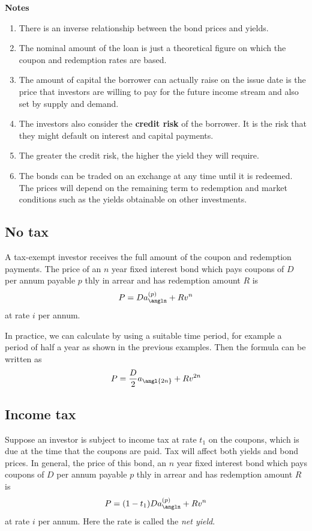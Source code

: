 \documentclass[landscape, 20pt]{extreport}
\theoremstyle{definition}
\theoremstyle{definition}
\theoremstyle{definition}
\theoremstyle{definition}
\theoremstyle{remark}
\begin{document}
\textbf{Notes}

\begin{enumerate}
\def\labelenumi{\arabic{enumi}.}
\item
  There is an inverse relationship between the bond prices and yields.
\item
  The nominal amount of the loan is just a theoretical figure on which
  the coupon and redemption rates are based.
\item
  The amount of capital the borrower can actually raise on the issue
  date is the price that investors are willing to pay for the future
  income stream and also set by supply and demand.
\item
  The investors also consider the \textbf{credit risk} of the borrower. It
  is the risk that they might default on interest and capital
  payments.
\item
  The greater the credit risk, the higher the yield they will require.
\item
  The bonds can be traded on an exchange at any time until it is
  redeemed. The prices will depend on the remaining term to redemption
  and market conditions such as the yields obtainable on other
  investments.
\end{enumerate}

\hypertarget{no-tax}{%
\subsection{No tax}\label{no-tax}}

A tax-exempt investor receives the full amount of the coupon and
redemption payments. The price of an \(n\) year fixed interest bond which
pays coupons of \(D\) per annum payable \(p\) thly in arrear and has
redemption amount \(R\) is \[P = D a_{\angln}^{(p)} + R v^n\] at rate \(i\)
per annum.

In practice, we can calculate by using a suitable time period, for
example a period of half a year as shown in the previous examples. Then
the formula can be written as
\[P = \frac{D}{2} a_{\angl{2n}} + R v^{2n}\]

\hypertarget{income-tax}{%
\subsection{Income tax}\label{income-tax}}

Suppose an investor is subject to income tax at rate \(t_1\) on the
coupons, which is due at the time that the coupons are paid. Tax will
affect both yields and bond prices. In general, the price of this bond,
an \(n\) year fixed interest bond which pays coupons of \(D\) per annum
payable \(p\) thly in arrear and has redemption amount \(R\) is
\[P = (1 - t_1) D a_{\angln}^{(p)} + R v^n\] at rate \(i\) per annum. Here
the rate is called the \emph{net yield}.
\end{document}
